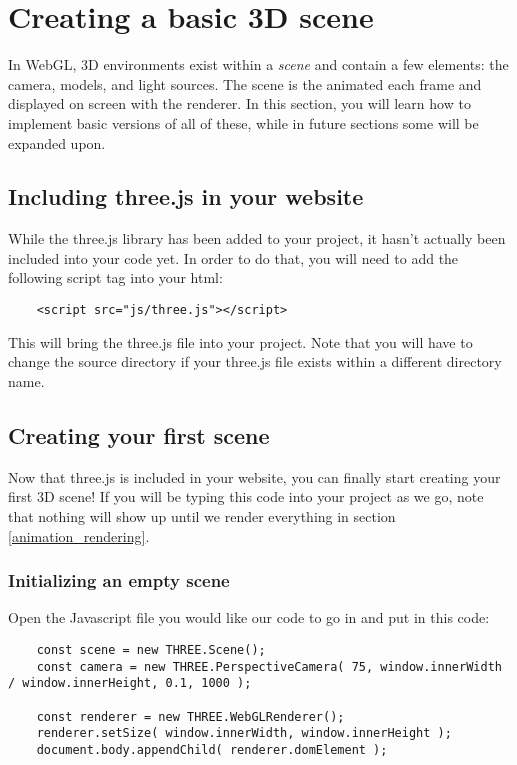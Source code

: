 \documentclass[10pt,final,journal,compsoc]{IEEEtran}
\begin{document}

\section{Creating a basic 3D scene}
In WebGL, 3D environments exist within a \textit{scene} and contain a few elements: the camera, models, and light sources. The scene is the animated each frame and displayed on screen with the renderer. In this section, you will learn how to implement basic versions of all of these, while in future sections some will be expanded upon.

    \subsection{Including three.js in your website}
    While the three.js library has been added to your project, it hasn't actually been included into your code yet. In order to do that, you will need to add the following script tag into your html:
    
    \begin{lstlisting}
    <script src="js/three.js"></script>
    \end{lstlisting}
    
    This will bring the three.js file into your project. Note that you will have to change the source directory if your three.js file exists within a different directory name.
    
    \subsection{Creating your first scene}
    Now that three.js is included in your website, you can finally start creating your first 3D scene! If you will be typing this code into your project as we go, note that nothing will show up until we render everything in section \ref{animation_rendering}.
    
        \subsubsection{Initializing an empty scene} \label{empty_scene}
        Open the Javascript file you would like our code to go in and put in this code:
        
        \begin{lstlisting}
    const scene = new THREE.Scene();
    const camera = new THREE.PerspectiveCamera( 75, window.innerWidth / window.innerHeight, 0.1, 1000 );
        
    const renderer = new THREE.WebGLRenderer();
    renderer.setSize( window.innerWidth, window.innerHeight );
    document.body.appendChild( renderer.domElement );
        \end{lstlisting}
        
\end{document}
